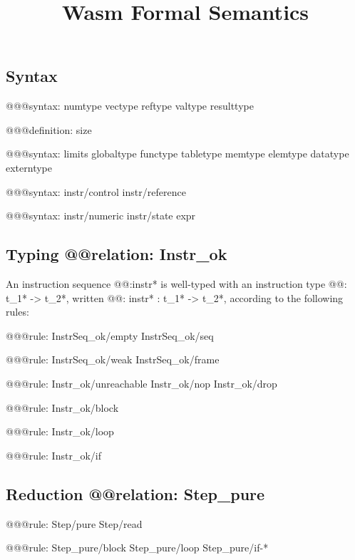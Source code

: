 \documentclass[a4paper]{scrartcl}
\title{Wasm Formal Semantics}
\begin{document}
\small

\maketitle


\subsection*{Syntax}

@@@{syntax: numtype vectype reftype valtype resulttype}

@@@{definition: size}

@@@{syntax:
  limits
  globaltype
  functype
  tabletype
  memtype
  elemtype
  datatype
  externtype
}

@@@{syntax: instr/control instr/reference}

@@@{syntax: instr/numeric instr/state expr}


\subsection*{Typing @@{relation: Instr_ok}}

An instruction sequence @@{:instr*} is well-typed with an instruction type @@{: t_1* -> t_2*}, written @@{: instr* : t_1* -> t_2*}, according to the following rules:

@@@{rule: InstrSeq_ok/empty InstrSeq_ok/seq}

@@@{rule: InstrSeq_ok/weak InstrSeq_ok/frame}


@@@{rule: Instr_ok/unreachable Instr_ok/nop Instr_ok/drop}

@@@{rule: Instr_ok/block}

@@@{rule: Instr_ok/loop}

@@@{rule: Instr_ok/if}


\subsection*{Reduction @@{relation: Step_pure}}

@@@{rule: Step/pure Step/read}

@@@{rule: Step_pure/block Step_pure/loop Step_pure/if-*}
\end{document}

